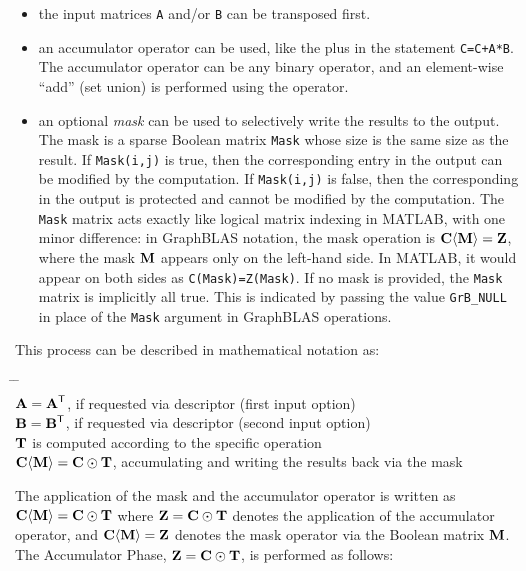 \documentclass[12pt]{article}
\begin{document}
\begin{itemize}
\item the input matrices \verb'A' and/or \verb'B' can be transposed first.

\item an accumulator operator can be used, like the plus in the statement
    \verb'C=C+A*B'.  The accumulator operator can be any binary operator, and
    an element-wise ``add'' (set union) is performed using the operator.

\item an optional {\em mask} can be used to selectively write the results to
    the output.  The mask is a sparse Boolean matrix \verb'Mask' whose size is
    the same size as the result.  If \verb'Mask(i,j)' is true, then the
    corresponding entry in the output can be modified by the computation.  If
    \verb'Mask(i,j)' is false, then the corresponding in the output is
    protected and cannot be modified by the computation.  The \verb'Mask'
    matrix acts exactly like logical matrix indexing in MATLAB, with one
    minor difference: in GraphBLAS notation, the mask operation is $\bf C
    \langle M \rangle = Z$, where the mask $\bf M$ appears only on the
    left-hand side.  In MATLAB, it would appear on both sides as
    \verb'C(Mask)=Z(Mask)'.  If no mask is provided, the \verb'Mask' matrix is
    implicitly all true.  This is indicated by passing the value
    \verb'GrB_NULL' in place of the \verb'Mask' argument in GraphBLAS
    operations.

\end{itemize}

\noindent
This process can be described in mathematical notation as:
    \vspace{-0.2in}
    {\small
    \begin{tabbing}
    \hspace{2em} \= \hspace{2em} \= \hspace{2em} \= \\
    \> ${\bf A = A}^{\sf T}$, if requested via descriptor (first input option) \\
    \> ${\bf B = B}^{\sf T}$, if requested via descriptor (second input option) \\
    \> ${\bf T}$ is computed according to the specific operation  \\
    \> ${\bf C \langle M \rangle = C \odot T}$,
        accumulating and writing the results back via the mask
    \end{tabbing} }
\noindent
The application of the mask and the accumulator operator is written as
${\bf C \langle M \rangle = C \odot T}$ where ${\bf Z = C \odot T}$ denotes the
application of the accumulator operator, and
${\bf C \langle M \rangle = Z}$
denotes the mask operator via the Boolean matrix ${\bf M}$.  The Accumulator
Phase, ${\bf Z = C \odot T}$, is performed as follows:
\end{document}
